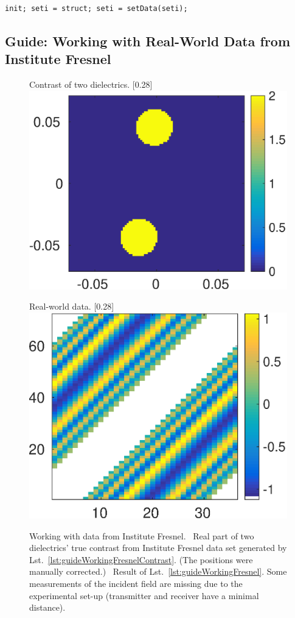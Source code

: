 \documentclass[a4paper]{article}
\begin{document}
\begin{lstlisting}[caption={Introduction of the function \textsf{setData} (\emph{source code}: \textsf{guides/guideSetData.m}).},label=lst:guideSetData]
init; seti = struct; seti = setData(seti);
\end{lstlisting}


\subsection{Guide: Working with Real-World Data from Institute Fresnel}\label{sec:guide:workingFresnel}

\begin{figure}
\centering
\begin{subcaptionbox}{Contrast of two dielectrics.
   \label{fig:guide:WorkingFresnelContrast}}[0.28\textwidth]{
   \includegraphics[height=0.22\textwidth]{figs/fig_guideWorkingFresnelContrast}
  }
\end{subcaptionbox}\hspace{2em}
\begin{subcaptionbox}{Real-world data.
   \label{fig:guide:WorkingFresnelMat}}[0.28\textwidth]{
   \includegraphics[height=0.22\textwidth]{figs/fig_guideWorkingFresnel}
  }
\end{subcaptionbox}
\caption{Working with data from Institute Fresnel. 
~Real part of two dielectrics' true contrast from Institute Fresnel data set generated by Lst.~\ref{lst:guideWorkingFresnelContrast}. (The positions were manually corrected.) 
~Result of Lst.~\ref{lst:guideWorkingFresnel}. Some measurements of the incident field are missing due to the experimental set-up (transmitter and receiver have a minimal distance).}
\label{fig:guide:workingFresnel}
\end{figure}
\end{document}
